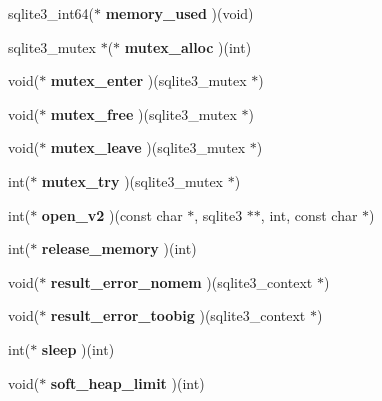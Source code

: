 \begin{CompactItemize}
\item 
sqlite3\_\-int64($\ast$ \textbf{memory\_\-used} )(void)\label{structsqlite3__api__routines_be5f5ab6961ecf223720018250232728}

\item 
sqlite3\_\-mutex $\ast$($\ast$ \textbf{mutex\_\-alloc} )(int)\label{structsqlite3__api__routines_1694d7b331f61cf5c7a7fb05cc39b580}

\item 
void($\ast$ \textbf{mutex\_\-enter} )(sqlite3\_\-mutex $\ast$)\label{structsqlite3__api__routines_21975d5ff465199d3b79e9e313cfc801}

\item 
void($\ast$ \textbf{mutex\_\-free} )(sqlite3\_\-mutex $\ast$)\label{structsqlite3__api__routines_e34caaf8a9e17927a23175ebbd9866d1}

\item 
void($\ast$ \textbf{mutex\_\-leave} )(sqlite3\_\-mutex $\ast$)\label{structsqlite3__api__routines_372dd2c4aaa7f71090f76b9c9256ad2f}

\item 
int($\ast$ \textbf{mutex\_\-try} )(sqlite3\_\-mutex $\ast$)\label{structsqlite3__api__routines_afd79e089da26e858ba70fa309ff1ef4}

\item 
int($\ast$ \textbf{open\_\-v2} )(const char $\ast$, sqlite3 $\ast$$\ast$, int, const char $\ast$)\label{structsqlite3__api__routines_40dd32889e0ba459db99fdef07663d0a}

\item 
int($\ast$ \textbf{release\_\-memory} )(int)\label{structsqlite3__api__routines_7e32043b1aa7ba1b825bb5aeabb080cf}

\item 
void($\ast$ \textbf{result\_\-error\_\-nomem} )(sqlite3\_\-context $\ast$)\label{structsqlite3__api__routines_df40275acd4f8897118d5d4780af4e6c}

\item 
void($\ast$ \textbf{result\_\-error\_\-toobig} )(sqlite3\_\-context $\ast$)\label{structsqlite3__api__routines_a8929fef49d9d32ac8f2f687dc3977e0}

\item 
int($\ast$ \textbf{sleep} )(int)\label{structsqlite3__api__routines_88a57bd1e9f540f7b210ef06c658483e}

\item 
void($\ast$ \textbf{soft\_\-heap\_\-limit} )(int)\label{structsqlite3__api__routines_8a05a4d3e8498bb401178416a55b0e69}


\end{CompactItemize}

